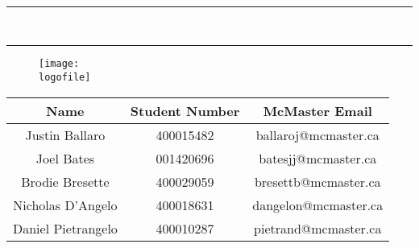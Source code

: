 \begin{titlepage}

\newcommand{\HRule}{\rule{\linewidth}{0.5mm}}

\center

\textsc{\LARGE \org}\\[1.5cm] %
\textsc{\Large \headingmajor}\\[0.5cm] %
\textsc{\large \headingminor}\\[0.5cm] %

\vspace{1cm}
\HRule \\[0.2cm]
{ \Large \vspace{0.25cm}  \textsc{  \LARGE \doctitle} \vspace{0.3cm} }  %
\HRule \vspace{.5cm}
\textsc{\LARGE \projtitle} %
\vspace{1cm}

\begin{figure}[h]
  \centering
  \texttt{[image: \\logofile]}
\end{figure}
 \vspace{1cm}
 
\begin{table}[ht!] \centering
\begin{tabular}{c c c}
\toprule
\textbf{Name} & \textbf{Student Number} & \textbf{McMaster Email} \\ 
\midrule
Justin Ballaro & 400015482 & ballaroj@mcmaster.ca \\
Joel Bates & 001420696 & batesjj@mcmaster.ca \\
Brodie Bresette & 400029059 & bresettb@mcmaster.ca \\
Nicholas D'Angelo & 400018631 &  dangelon@mcmaster.ca  \\
Daniel Pietrangelo & 400010287 &  pietrand@mcmaster.ca \\
\bottomrule
\end{tabular}
\label{Tab:HU}
\end{table}

{\large \projdate}\\[3cm]
\end{titlepage}

